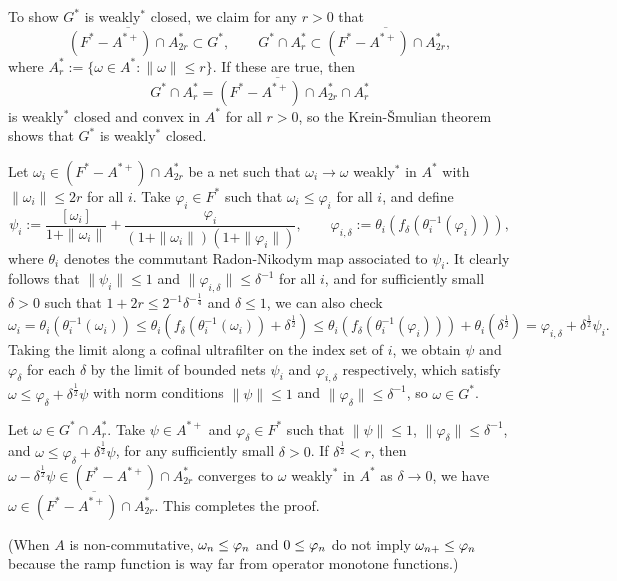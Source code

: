 \documentclass{../../../../small}
\begin{document}
\begin{pf}[Proof of (d)]
To show $G^*$ is weakly$^*$ closed, we claim for any $r>0$ that 
\[\overline{(F^*-A^{*+})\cap A_{2r}^*}\subset G^*,\qquad G^*\cap A_r^*\subset\overline{(F^*-A^{*+})\cap A_{2r}^*},\]
where $A_r^*:=\{\omega\in A^*:\|\omega\|\le r\}$.
If these are true, then
\[G^*\cap A_r^*=\overline{(F^*-A^{*+})\cap A_{2r}^*}\cap A_r^*\]
is weakly$^*$ closed and convex in $A^*$ for all $r>0$, so the Krein-\v Smulian theorem shows that $G^*$ is weakly$^*$ closed.

Let $\omega_i\in(F^*-A^{*+})\cap A_{2r}^*$ be a net such that $\omega_i\to\omega$ weakly$^*$ in $A^*$ with $\|\omega_i\|\le2r$ for all $i$.
Take $\varphi_i\in F^*$ such that $\omega_i\le\varphi_i$ for all $i$, and define
\[\psi_i:=\frac{[\omega_i]}{1+\|\omega_i\|}+\frac{\varphi_i}{(1+\|\omega_i\|)(1+\|\varphi_i\|)},\qquad\varphi_{i,\delta}:=\theta_i(f_\delta(\theta_i^{-1}(\varphi_i))),\]
where $\theta_i$ denotes the commutant Radon-Nikodym map associated to $\psi_i$.
It clearly follows that $\|\psi_i\|\le1$ and $\|\varphi_{i,\delta}\|\le\delta^{-1}$ for all $i$, and for sufficiently small $\delta>0$ such that $1+2r\le2^{-1}\delta^{-\frac14}$ and $\delta\le1$, we can also check
\[\omega_i=\theta_i(\theta_i^{-1}(\omega_i))\le\theta_i(f_\delta(\theta_i^{-1}(\omega_i))+\delta^{\frac12})\le\theta_i(f_\delta(\theta_i^{-1}(\varphi_i)))+\theta_i(\delta^{\frac12})=\varphi_{i,\delta}+\delta^{\frac12}\psi_i.\]
Taking the limit along a cofinal ultrafilter on the index set of $i$, we obtain $\psi$ and $\varphi_\delta$ for each $\delta$ by the limit of bounded nets $\psi_i$ and $\varphi_{i,\delta}$ respectively, which satisfy $\omega\le\varphi_\delta+\delta^{\frac12}\psi$ with norm conditions $\|\psi\|\le1$ and $\|\varphi_\delta\|\le\delta^{-1}$, so $\omega\in G^*$.

Let $\omega\in G^*\cap A_r^*$.
Take $\psi\in A^{*+}$ and $\varphi_\delta\in F^*$ such that $\|\psi\|\le1$, $\|\varphi_\delta\|\le\delta^{-1}$, and $\omega\le\varphi_\delta+\delta^{\frac12}\psi$, for any sufficiently small $\delta>0$.
If $\delta^{\frac12}<r$, then $\omega-\delta^{\frac12}\psi\in(F^*-A^{*+})\cap A_{2r}^*$ converges to $\omega$ weakly$^*$ in $A^*$ as $\delta\to0$, we have $\omega\in\overline{(F^*-A^{*+})\cap A_{2r}^*}$.
This completes the proof.
\end{pf}



(When $A$ is non-commutative, $\omega_n\le\varphi_n$ and $0\le\varphi_n$ do not imply $\omega_{n+}\le\varphi_n$ because the ramp function is way far from operator monotone functions.)
\end{document}
